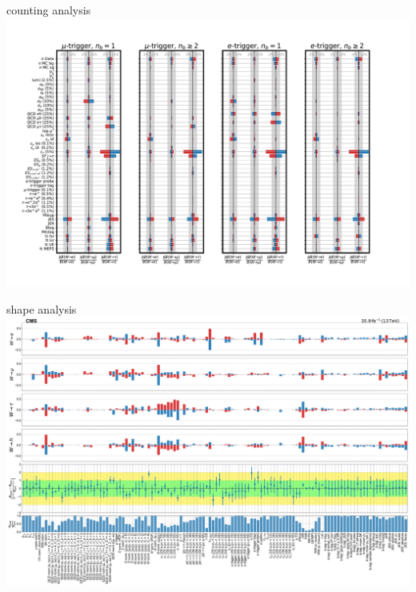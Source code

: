 \begin{frame}{}
counting analysis
    \centering
    \includegraphics[width=\textwidth, trim=1.5cm 0cm 3.5cm 1cm, clip]{chapters/Analysis/sectionSystematics/figures/systematics_impact_counting.pdf}
\end{frame}

\begin{frame}{}
shape analysis
    \centering
    \includegraphics[width=\textwidth]{chapters/Analysis/sectionSystematics/figures/pulls_impacts_final.pdf}
\end{frame}









